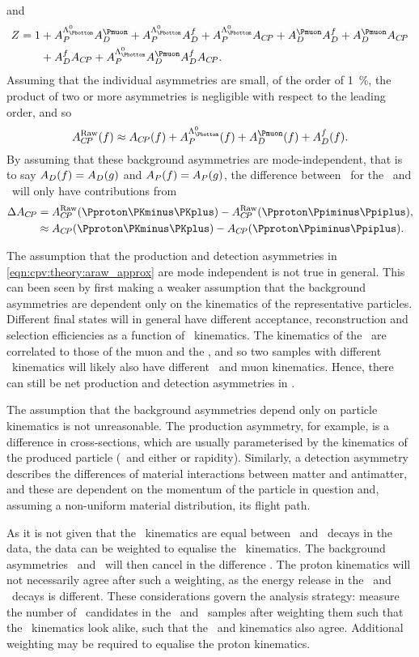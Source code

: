 and
\begin{align}
  Z = 1 &+ \APLb\ADmu + \APLb\ADf + \APLb\ACP + \ADmu\ADf + \ADmu\ACP \nonumber\\
        &+ \ADf\ACP + \APLb\ADmu\ADf\ACP.
\end{align}
Assuming that the individual asymmetries are small, of the order of 
\SI{1}{\percent}, the product of two or more asymmetries is negligible with 
respect to the leading order, and so
\begin{equation}
  \ARaw(f) \approx \ACP(f) + \APLb(f) + \ADmu(f) + \ADf(f).
  \label{eqn:cpv:theory:araw_approx}
\end{equation}
By assuming that these background asymmetries are mode-independent, that is to 
say $A_{D}(f) = A_{D}(g)$ and $A_{P}(f) = A_{P}(g)$, the difference between \ARaw\ for 
the \pKK\ and \ppipi\ will only have contributions from \ACP
\begin{align}
  \dACP &= \ARaw(\pKK) - \ARaw(\ppipi),\label{eqn:cpv:theory:dacp}\\
        &\approx \ACP(\pKK) - \ACP(\ppipi)\nonumber.
\end{align}

The assumption that the production and detection asymmetries in 
\cref{eqn:cpv:theory:araw_approx} are mode independent is not true in general.
This can been seen by first making a weaker assumption that the background 
asymmetries are dependent only on the kinematics of the representative 
particles.
Different final states will in general have different acceptance, 
reconstruction and selection efficiencies as a function of \PLambdac\ 
kinematics.
The kinematics of the \PLambdac\ are correlated to those of the muon and the 
\PLambdab, and so two samples with different \PLambdac\ kinematics will likely 
also have different \PLambdab\ and muon kinematics.
Hence, there can still be net production and detection asymmetries in \dACP\@.

The assumption that the background asymmetries depend only on particle 
kinematics is not unreasonable.
The production asymmetry, for example, is a difference in cross-sections, which 
are usually parameterised by the kinematics of the produced particle (\pT\ and 
either \Eta or rapidity).
Similarly, a detection asymmetry describes the differences of material 
interactions between matter and antimatter, and these are dependent on the 
momentum of the particle in question and, assuming a non-uniform material 
distribution, its flight path.

As it is not given that the \PLambdac\ kinematics are equal between \LcTopKK\ 
and \LcToppipi\ decays in the data, the data can be weighted to equalise the 
\PLambdac\ kinematics.
The background asymmetries \AP\ and \ADmu\ will then cancel in the difference 
\dACP\@.
The proton kinematics will not necessarily agree after such a weighting, as the 
energy release in the \pKK\ and \ppipi\ decays is different.
These considerations govern the analysis strategy: measure the number of 
\PLambdac\ candidates in the \pKK\ and \ppipi\ samples after weighting them 
such that the \PLambdac\ kinematics look alike, such that the \PLambdab\ and 
\Pmuon kinematics also agree.
Additional weighting may be required to equalise the proton kinematics.

